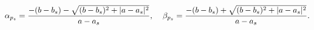 \begin{equation}
\alpha_{p_s}={-(b-b_s)-\sqrt{(b-b_s)^2+|a-a_s|^2}\over
a-a_s},\:\:\:\:\:\beta_{p_s}={-(b-b_s)+\sqrt{(b-b_s)^2+|a-a_s|^2}\over
a-a_s}.
\label{gyokok}
\end{equation}

